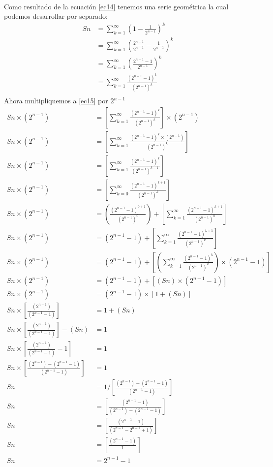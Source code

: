 \documentclass[12pt]{article}
\begin{document}
 \paragraph{} Como resultado de la ecuación \ref{ec14} tenemos una serie geométrica la cual podemos desarrollar por separado:\\
 \begin{equation}\label{ec15}
 \begin{split}
 Sn & = \sum_{k=1}^{\infty}{(1  - \frac{1}{2^{n-1}})^{k}}\\
 & = \sum_{k=1}^{\infty}{(\frac{2^{n-1}}{2^{n-1}}  - \frac{1}{2^{n-1}})^{k}}\\
 & = \sum_{k=1}^{\infty}{(\frac{2^{n-1} - 1}{2^{n-1}})^{k}}\\
 & = \sum_{k=1}^{\infty}{\frac{(2^{n-1} - 1)^{k}}{(2^{n-1})^{k}}}\\
 \end{split}
 \end{equation}
Ahora multipliquemos a \ref{ec15} por $2^{n-1}$\\
\begin{equation}\label{ec16}
\begin{split}
Sn\times (2^{n-1})& = [\sum_{k=1}^{\infty}{\frac{(2^{n-1} - 1)^{k}}{(2^{n-1})^{k}}}] \times (2^{n-1})\\
Sn\times (2^{n-1})& = [\sum_{k=1}^{\infty}{\frac{(2^{n-1} - 1)^{k} \times (2^{n-1}) }{(2^{n-1})^{k}}}]\\
Sn\times (2^{n-1})& = [\sum_{k=1}^{\infty}{\frac{(2^{n-1} - 1)^{k}}{(2^{n-1})^{k-1}}}]\\
Sn\times (2^{n-1})& = [\sum_{k=0}^{\infty}{\frac{(2^{n-1} - 1)^{k+1}}{(2^{n-1})^{k}}}]\\
Sn\times (2^{n-1})& = (\frac{(2^{n-1} - 1)^{0+1}}{(2^{n-1})^{0}}) + [\sum_{k=1}^{\infty}{\frac{(2^{n-1} - 1)^{k+1}}{(2^{n-1})^{k}}}]\\
Sn\times (2^{n-1})& = (2^{n-1} - 1) + [\sum_{k=1}^{\infty}{\frac{(2^{n-1} - 1)^{k+1}}{(2^{n-1})^{k}}}]\\
Sn\times (2^{n-1})& = (2^{n-1} - 1) + [(\sum_{k=1}^{\infty}{\frac{(2^{n-1} - 1)^{k}}{(2^{n-1})^{k}}})\times (2^{n-1} - 1)]\\
Sn\times (2^{n-1})& = (2^{n-1} - 1) + [(Sn)\times (2^{n-1} - 1)]\\
Sn\times (2^{n-1})& = (2^{n-1} - 1) \times [1 + (Sn)]\\
Sn\times [\frac{(2^{n-1})}{(2^{n-1} - 1)}]& = 1 + (Sn)\\
Sn\times [\frac{(2^{n-1})}{(2^{n-1} - 1)}] - (Sn)& = 1\\
Sn\times [\frac{(2^{n-1})}{(2^{n-1} - 1)} - 1]& = 1\\
Sn\times [\frac{(2^{n-1}) - (2^{n-1} - 1) }{(2^{n-1} - 1)}]& = 1\\
Sn & = 1 / [\frac{(2^{n-1}) - (2^{n-1} - 1) }{(2^{n-1} - 1)}]\\
Sn & = [\frac{(2^{n-1} - 1)}{(2^{n-1}) - (2^{n-1} - 1)}]\\
Sn & = [\frac{(2^{n-1} - 1)}{(2^{n-1} - 2^{n-1} + 1)}]\\
Sn & = [\frac{(2^{n-1} - 1)}{1}]\\
Sn & = 2^{n-1} - 1\\
\end{split}
\end{equation}
\end{document}

